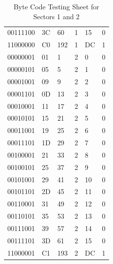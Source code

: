 \documentclass[12pt,a4paper]{report}
\begin{document}
\begin{table}[]
\begin{tabular}{llllll}
00111100                                               & 3C        & 60            & 1      & 15     & 0       \\
11000000                                               & C0        & 192           & 1      & DC     & 1       \\
00000001                                               & 01        & 1             & 2      & 0      & 0       \\
00000101                                               & 05        & 5             & 2      & 1      & 0       \\
00001001                                               & 09        & 9             & 2      & 2      & 0       \\
00001101                                               & 0D        & 13            & 2      & 3      & 0       \\
00010001                                               & 11        & 17            & 2      & 4      & 0       \\
00010101                                               & 15        & 21            & 2      & 5      & 0       \\
00011001                                               & 19        & 25            & 2      & 6      & 0       \\
00011101                                               & 1D        & 29            & 2      & 7      & 0       \\
00100001                                               & 21        & 33            & 2      & 8      & 0       \\
00100101                                               & 25        & 37            & 2      & 9      & 0       \\
00101001                                               & 29        & 41            & 2      & 10     & 0       \\
00101101                                               & 2D        & 45            & 2      & 11     & 0       \\
00110001                                               & 31        & 49            & 2      & 12     & 0       \\
00110101                                               & 35        & 53            & 2      & 13     & 0       \\
00111001                                               & 39        & 57            & 2      & 14     & 0       \\
00111101                                               & 3D        & 61            & 2      & 15     & 0       \\
11000001                                               & C1        & 193           & 2      & DC     & 1       \\    
\end{tabular}
\caption{Byte Code Testing Sheet for Sectors 1 and 2} %
\label{tab:Testing Table Sectors 1 and 2} 
\end{table}
\end{document}

